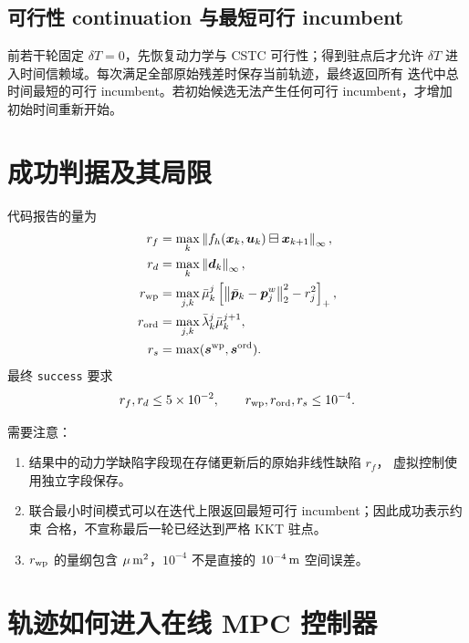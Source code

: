 \documentclass[UTF8,a4paper,11pt]{ctexart}
\newcommand{\normtwo}[1]{\left\lVert#1\right\rVert_2}
\newcommand{\norminf}[1]{\left\lVert#1\right\rVert_\infty}
\newcommand{\positive}[1]{\left[#1\right]_+}
\newcommand{\code}[1]{\texttt{#1}}
\begin{document}
\subsection{可行性 continuation 与最短可行 incumbent}

前若干轮固定 $\delta T=0$，先恢复动力学与 CSTC 可行性；得到驻点后才允许
$\delta T$ 进入时间信赖域。每次满足全部原始残差时保存当前轨迹，最终返回所有
迭代中总时间最短的可行 incumbent。若初始候选无法产生任何可行 incumbent，才增加
初始时间重新开始。

\section{成功判据及其局限}

代码报告的量为
\begin{align}
 r_f&=\max_k\norminf{f_h(\bm x_k,\bm u_k)\boxminus\bm x_{k+1}},\\
 r_d&=\max_k\norminf{\bm d_k},\\
 r_{\rm wp}&=\max_{j,k}\bar\mu_k^j
 \positive{\normtwo{\bar{\bm p}_k-\bm p_j^w}^2-r_j^2},\\
 r_{\rm ord}&=\max_{j,k}\bar\lambda_k^j\bar\mu_k^{j+1},\\
 r_s&=\max(\bm s^{\rm wp},\bm s^{\rm ord}).
\end{align}
最终 \code{success} 要求
\begin{equation}
 r_f,r_d\leq5\times10^{-2},\qquad
 r_{\rm wp},r_{\rm ord},r_s\leq10^{-4}.
\end{equation}

需要注意：
\begin{enumerate}
  \item 结果中的动力学缺陷字段现在存储更新后的原始非线性缺陷 $r_f$，
  虚拟控制使用独立字段保存。
  \item 联合最小时间模式可以在迭代上限返回最短可行 incumbent；因此成功表示约束
  合格，不宣称最后一轮已经达到严格 KKT 驻点。
  \item $r_{\rm wp}$ 的量纲包含 $\mu\,{\rm m^2}$，$10^{-4}$ 不是直接的
  $10^{-4}\,{\rm m}$ 空间误差。
\end{enumerate}

\section{轨迹如何进入在线 MPC 控制器}
\end{document}
